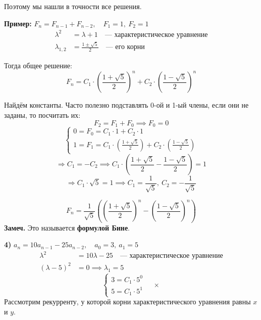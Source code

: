 \documentclass[10pt, a4paper]{article}
\begin{document}
\noindent Поэтому мы нашли в точности все решения.

\vspace{1em}
\noindent \textbf{Пример:} $F_n = F_{n-1} + F_{n-2}, \quad F_1 = 1, \ F_2 = 1$
\begin{align*}
    \lambda^2 &= \lambda + 1 \quad \text{— характеристическое уравнение}\\
    \lambda_{1,2} &= \frac{1 \pm \sqrt{5}}{2} \quad \text{— его корни}
\end{align*}

\noindent Тогда общее решение:
$$ F_n = C_1 \cdot \left(\frac{1+\sqrt{5}}{2}\right)^n + C_2 \cdot \left(\frac{1-\sqrt{5}}{2}\right)^n $$

\vspace{0.5em}
\noindent Найдём константы. Часто полезно подставлять 0-ой и 1-ый члены, если они не заданы, то посчитать их:
$$ F_2 = F_1 + F_0 \implies F_0 = 0 $$
$$
\begin{cases}
    0 = F_0 = C_1 \cdot 1 + C_2 \cdot 1 \\
    1 = F_1 = C_1 \cdot \left(\frac{1+\sqrt{5}}{2}\right) + C_2 \cdot \left(\frac{1-\sqrt{5}}{2}\right)
\end{cases}
$$
$$ \Rightarrow C_1 = -C_2 \implies C_1 \cdot \left(\frac{1+\sqrt{5}}{2} - \frac{1-\sqrt{5}}{2}\right) = 1 $$
$$ \Rightarrow C_1 \cdot \sqrt{5} = 1 \implies C_1 = \frac{1}{\sqrt{5}}, \ C_2 = -\frac{1}{\sqrt{5}} $$

$$ F_n = \frac{1}{\sqrt{5}} \left( \left(\frac{1+\sqrt{5}}{2}\right)^n - \left(\frac{1-\sqrt{5}}{2}\right)^n \right) $$
\noindent \textbf{Замеч.} Это называется \textbf{формулой Бине}.

\vspace{1.5em}
\noindent \textbf{4)} $a_n = 10a_{n-1} - 25a_{n-2}, \quad a_0 = 3, \ a_1 = 5$ %
\begin{align*}
    \lambda^2 &= 10\lambda - 25 \quad \text{— характеристическое уравнение}\\
    (\lambda - 5)^2 &= 0 \implies \lambda_1 = 5 \quad 
\end{align*}
$$
\begin{cases}
    3 = C_1 \cdot 5^0 \\
    5 = C_1 \cdot 5^1
\end{cases} \quad \times
$$
\noindent Рассмотрим рекурренту, у которой корни характеристического уравнения равны $x$ и $y$.
\end{document}
